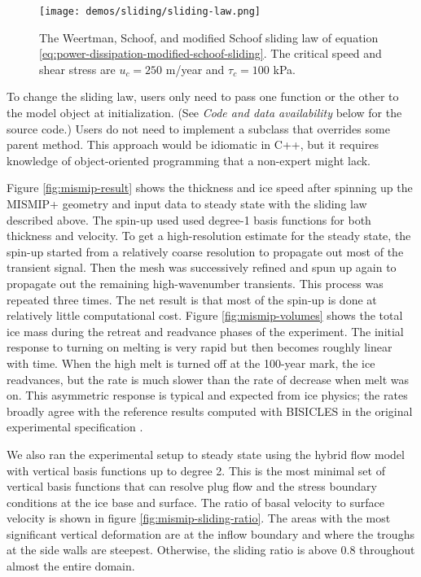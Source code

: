 \documentclass[journal abbreviation, manuscript]{copernicus}
\begin{document}
\begin{figure}[h]
    \texttt{[image: demos/sliding/sliding-law.png]}
    \caption{The Weertman, Schoof, and modified Schoof sliding law of equation \eqref{eq:power-dissipation-modified-schoof-sliding}.
    The critical speed and shear stress are $u_c = 250$ m/year and $\tau_c = 100$ kPa.}
    \label{fig:sliding-laws}
\end{figure}

To change the sliding law, users only need to pass one function or the other to the model object at initialization.
(See \emph{Code and data availability} below for the source code.)
Users do not need to implement a subclass that overrides some parent method.
This approach would be idiomatic in C++, but it requires knowledge of object-oriented programming that a non-expert might lack.

Figure \ref{fig:mismip-result} shows the thickness and ice speed after spinning up the MISMIP+ geometry and input data to steady state with the sliding law described above.
The spin-up used used degree-1 basis functions for both thickness and velocity.
To get a high-resolution estimate for the steady state, the spin-up started from a relatively coarse resolution to propagate out most of the transient signal.
Then the mesh was successively refined and spun up again to propagate out the remaining high-wavenumber transients.
This process was repeated three times.
The net result is that most of the spin-up is done at relatively little computational cost.
Figure \ref{fig:mismip-volumes} shows the total ice mass during the retreat and readvance phases of the experiment.
The initial response to turning on melting is very rapid but then becomes roughly linear with time.
When the high melt is turned off at the 100-year mark, the ice readvances, but the rate is much slower than the rate of decrease when melt was on.
This asymmetric response is typical and expected from ice physics; the rates broadly agree with the reference results computed with BISICLES in the original experimental specification \citep{asay2016experimental}.

We also ran the experimental setup to steady state using the hybrid flow model with vertical basis functions up to degree 2.
This is the most minimal set of vertical basis functions that can resolve plug flow and the stress boundary conditions at the ice base and surface.
The ratio of basal velocity to surface velocity is shown in figure \ref{fig:mismip-sliding-ratio}.
The areas with the most significant vertical deformation are at the inflow boundary and where the troughs at the side walls are steepest.
Otherwise, the sliding ratio is above 0.8 throughout almost the entire domain.
\end{document}
